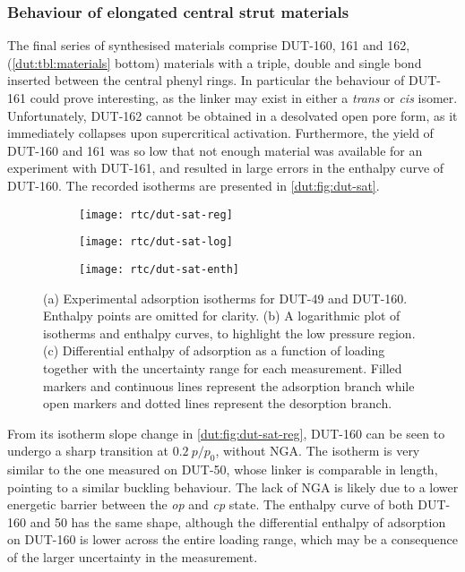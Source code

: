 \subsubsection{Behaviour of elongated central strut materials}

The final series of synthesised materials comprise DUT-160, 
161 and 162, (\autoref{dut:tbl:materials} bottom) 
materials with a triple, double and single bond 
inserted between the central phenyl rings. In particular 
the behaviour of DUT-161 could prove interesting, as the linker 
may exist in either a \textit{trans} or \textit{cis} isomer.
Unfortunately, DUT-162 cannot be obtained in a desolvated open 
pore form, as it 
immediately collapses upon supercritical activation. Furthermore,
the yield of DUT-160 and 161 was so low that not enough 
material was available for an experiment with DUT-161, and resulted
in large errors in the enthalpy curve of DUT-160.
The recorded isotherms are presented in \autoref{dut:fig:dut-sat}.

\begin{figure}[htb]
    \centering
    \begin{subfigure}{0.33\linewidth}
        \texttt{[image: rtc/dut-sat-reg]}%
        \caption{}\label{dut:fig:dut-sat-reg}
    \end{subfigure}%
    \begin{subfigure}{0.33\linewidth}
        \texttt{[image: rtc/dut-sat-log]}%
        \caption{}\label{dut:fig:dut-sat-log}
    \end{subfigure}%
    \begin{subfigure}{0.33\linewidth}
        \texttt{[image: rtc/dut-sat-enth]}%
        \caption{}\label{dut:fig:dut-sat-enth}
    \end{subfigure}%
    \caption{(a) Experimental adsorption isotherms for DUT-49 and 
    DUT-160. Enthalpy points are omitted for clarity. 
    (b) A logarithmic plot of isotherms and enthalpy curves,
    to highlight the low pressure region. 
    (c) Differential enthalpy of adsorption as a function of loading
    together with the uncertainty range for each measurement.
    Filled markers and continuous lines represent the adsorption 
    branch while open markers and dotted lines represent the 
    desorption branch.
    }\label{dut:fig:dut-sat}
\end{figure}

From its isotherm slope change in \autoref{dut:fig:dut-sat-reg},
DUT-160 can be seen to undergo a sharp transition at 
\(0.2~p/p_0\), without \gls{NGA}. The isotherm is very similar to the one
measured on DUT-50, whose linker is comparable in length, pointing to 
a similar buckling behaviour. The lack of \gls{NGA} is likely due to 
a lower energetic barrier between the \textit{op} and \textit{cp}
state. The enthalpy curve of both DUT-160 and 50 has the same 
shape, although the differential enthalpy of adsorption on 
DUT-160 is lower across the entire loading range, which may 
be a consequence of the larger uncertainty in the measurement.

